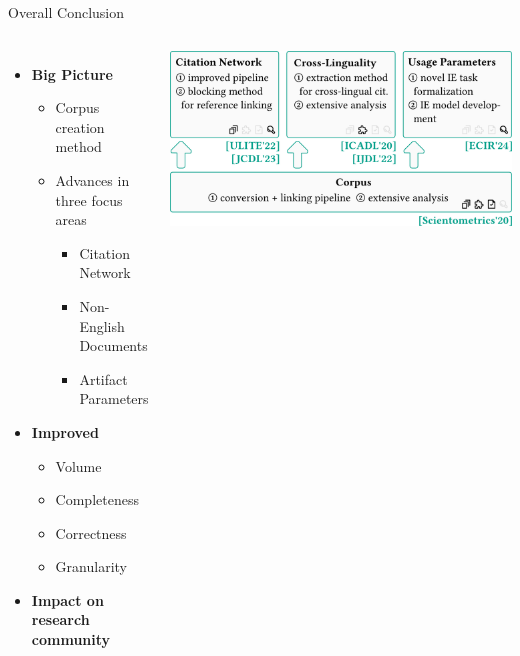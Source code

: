 \documentclass[en,16:9,smallfoot]{sdqbeamer}
\begin{document}
   \begin{frame}{Overall Conclusion}

   \begin{columns}
        \begin{itemize}
            \item \textbf{Big Picture}
            \begin{itemize}
                \item Corpus creation method
                \item Advances in three focus areas
                \begin{itemize}
                    \item Citation Network
                    \item Non-English Documents
                    \item Artifact Parameters
                \end{itemize}
            \end{itemize}
            \item \textbf{Improved}
            \begin{itemize}
                \item Volume
                \item Completeness
                \item Correctness
                \item Granularity
            \end{itemize}
            \item \textbf{Impact on research community}
        \end{itemize}
            \centering
            \includegraphics[width=\linewidth]{imgs/contrib_overview_v1}
   \end{columns}
   \end{frame}
\end{document}
